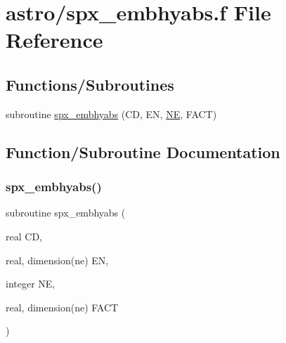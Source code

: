 \hypertarget{spx__embhyabs_8f}{}\section{astro/spx\+\_\+embhyabs.f File Reference}
\label{spx__embhyabs_8f}
\subsection*{Functions/\+Subroutines}
\begin{DoxyCompactItemize}
\item 
subroutine \hyperlink{spx__embhyabs_8f_afacfc8e169dd822483ee5149be95d22c}{spx\+\_\+embhyabs} (CD, EN, \hyperlink{eval__tab_8h_a5af9139e882aef6c820ae908589a40d6}{NE}, F\+A\+CT)
\end{DoxyCompactItemize}


\subsection{Function/\+Subroutine Documentation}
\mbox{\label{spx__embhyabs_8f_afacfc8e169dd822483ee5149be95d22c}} 
\subsubsection{\texorpdfstring{spx\+\_\+embhyabs()}{spx\_embhyabs()}}
{\footnotesize\ttfamily subroutine spx\+\_\+embhyabs (\begin{DoxyParamCaption}\item[{real}]{CD,  }\item[{real, dimension(ne)}]{EN,  }\item[{integer}]{NE,  }\item[{real, dimension(ne)}]{F\+A\+CT }\end{DoxyParamCaption})}

